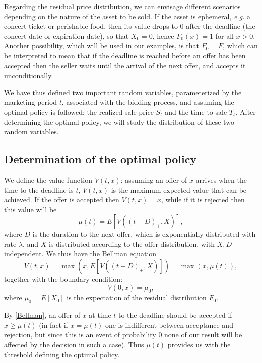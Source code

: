 \documentclass{article}
\numberwithin{equation}{section}
\begin{document}
Regarding the residual price distribution, we can envisage different scenarios depending on the nature of the asset to be sold. If the asset is ephemeral, {\it{e.g.}} a concert ticket or perishable food, then
its value drops to $0$ after the deadline (the concert date or expiration date), so that $X_0=0$, hence $F_0(x)=1$ for all $x>0$. Another possibility, which will be
used in our examples, is that $F_0=F$, which can be interpreted to mean that if the deadline is reached before an offer has been accepted then the seller waits until the arrival of the next offer, and accepts it unconditionally.

We have thus defined two important 
random variables, parameterized by the marketing period $t$, associated with the bidding process, and assuming the optimal policy is followed: the realized sale price $S_t$ and the time to sale $T_t$. After determining the optimal policy, we will study the distribution of these two random variables.



\subsection{Determination of the optimal policy}
\label{optimal_policy}

We define the value function $V(t,x)$:
assuming an offer of $x$ arrives when the time to 
the deadline is $t$, $V(t,x)$ is the maximum
expected value that can be achieved. If the offer 
is accepted then $V(t,x)=x$, while if
it is rejected then this value will be 
\begin{equation}\label{dmu}\mu(t)\doteq E[V((t-D)_+,X)],\end{equation}
where $D$ is the duration to the 
next offer, which is exponentially distributed 
with rate $\lambda$, and $X$ is distributed according to the offer distribution, with $X,D$ independent. We thus have
the Bellman equation
\begin{equation}\label{Bellman}V(t,x)=\max(x,E[V((t-D)_+,X)])=\max(x,\mu(t)),\end{equation}
together with the boundary condition:
\begin{equation}\label{bc}V(0,x)=\mu_0,\end{equation}
where $\mu_0=E[X_0]$ is the expectation of the 
residual distribution $F_0$.

By \eqref{Bellman}, an offer of $x$ at time $t$ to the deadline should be accepted if $x\geq \mu(t)$ (in fact if $x=\mu(t)$ one is indifferent between acceptance and rejection, but since this is an event of probability $0$ none of our result will be affected by the decision in such a case). Thus $\mu(t)$ provides us with the threshold defining the optimal policy.
\end{document}
